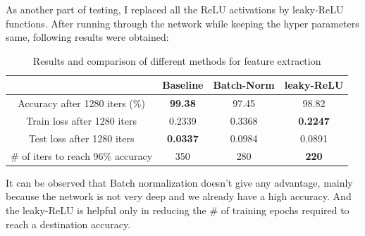 \documentclass[a4paper]{article}
\begin{document}

As another part of testing, I replaced all the ReLU activations by leaky-ReLU functions. After running through the network while keeping the hyper parameters same, following results were obtained:

\begin{table}[!htb]
\begin{center}
\begin{tabular}{cccc}
\toprule
\multicolumn{1}{c}{} & \multicolumn{1}{c}{Baseline} & \multicolumn{1}{c}{Batch-Norm} & \multicolumn{1}{c}{leaky-ReLU}\\
\midrule
Accuracy after 1280 iters (\%) & \textbf{99.38} & 97.45 & 98.82\\
Train loss after 1280 iters & 0.2339 & 0.3368 & \textbf{0.2247}\\
Test loss after 1280 iters & \textbf{0.0337} & 0.0984 & 0.0891\\
\# of iters to reach 96\% accuracy & 350 & 280 & \textbf{220}\\
\bottomrule
\end{tabular}
\caption{Results and comparison of different methods for feature extraction \label{table:1}}
\end{center}\end{table}
\vspace{-5pt}

It can be observed that Batch normalization doesn't give any advantage, mainly because the network is not very deep and we already have a high accuracy. And the leaky-ReLU is helpful only in reducing the # of training epochs required to reach a destination accuracy.
\end{document}
